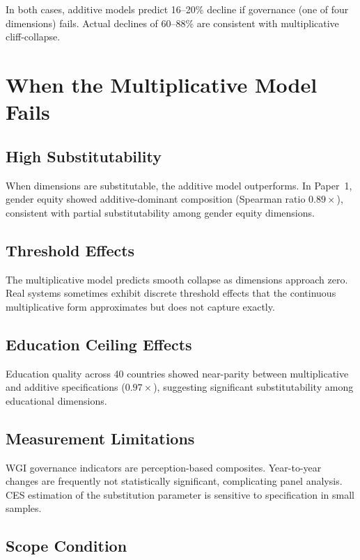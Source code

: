 \documentclass[12pt]{article}
\begin{document}
In both cases, additive models predict 16--20\% decline if governance (one of four dimensions) fails. Actual declines of 60--88\% are consistent with multiplicative cliff-collapse.


\section{When the Multiplicative Model Fails}
\label{sec:limitations}

\subsection{High Substitutability}

When dimensions are substitutable, the additive model outperforms. In Paper~1, gender equity showed additive-dominant composition (Spearman ratio $0.89\times$), consistent with partial substitutability among gender equity dimensions.

\subsection{Threshold Effects}

The multiplicative model predicts smooth collapse as dimensions approach zero. Real systems sometimes exhibit discrete threshold effects that the continuous multiplicative form approximates but does not capture exactly.

\subsection{Education Ceiling Effects}

Education quality across 40 countries showed near-parity between multiplicative and additive specifications ($0.97\times$), suggesting significant substitutability among educational dimensions.

\subsection{Measurement Limitations}

WGI governance indicators are perception-based composites. Year-to-year changes are frequently not statistically significant, complicating panel analysis. CES estimation of the substitution parameter is sensitive to specification in small samples.

\subsection{Scope Condition}
\end{document}
